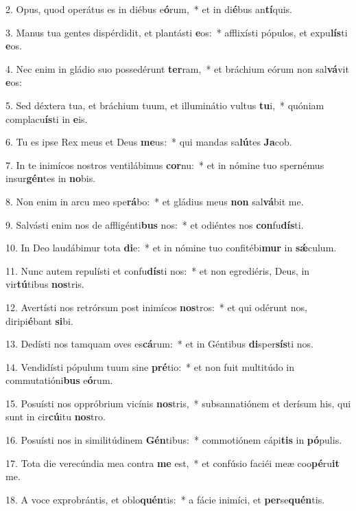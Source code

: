 2. Opus, quod operátus es in diébus e\textbf{ó}rum,~*  et in di\textbf{é}bus an\textbf{tí}quis.\

3. Manus tua gentes dispérdidit, et plantásti \textbf{e}os:~*  afflixísti pópulos, et expu\textbf{lís}ti \textbf{e}os.\

4. Nec enim in gládio suo possedérunt \textbf{ter}ram,~*  et bráchium eórum non sal\textbf{vá}vit \textbf{e}os:\

5. Sed déxtera tua, et bráchium tuum, et illuminátio vultus \textbf{tu}i,~*  quóniam complacu\textbf{ís}ti in \textbf{e}is.\

6. Tu es ipse Rex meus et Deus \textbf{me}us:~*  qui mandas sa\textbf{lú}tes \textbf{Ja}cob.\

7. In te inimícos nostros ventilábimus \textbf{cor}nu:~*  et in nómine tuo spernémus insur\textbf{gén}tes in \textbf{no}bis.\

8. Non enim in arcu meo spe\textbf{rá}bo:~*  et gládius meus \textbf{non} sal\textbf{vá}bit me.\

9. Salvásti enim nos de affligénti\textbf{bus} nos:~*  et odiéntes nos \textbf{con}fu\textbf{dís}ti.\

10. In Deo laudábimur tota \textbf{di}e:~*  et in nómine tuo confitébi\textbf{mur} in \textbf{sǽ}culum.\

11. Nunc autem repulísti et confu\textbf{dís}ti nos:~*  et non egrediéris, Deus, in vir\textbf{tú}tibus \textbf{nos}tris.\

12. Avertísti nos retrórsum post inimícos \textbf{nos}tros:~*  et qui odérunt nos, diripi\textbf{é}bant \textbf{si}bi.\

13. Dedísti nos tamquam oves es\textbf{cá}rum:~*  et in Géntibus \textbf{di}sper\textbf{sís}ti nos.\

14. Vendidísti pópulum tuum sine \textbf{pré}tio:~*  et non fuit multitúdo in commutatióni\textbf{bus} e\textbf{ó}rum.\

15. Posuísti nos oppróbrium vicínis \textbf{nos}tris,~*  subsannatiónem et derísum his, qui sunt in cir\textbf{cú}itu \textbf{nos}tro.\

16. Posuísti nos in similitúdinem \textbf{Gén}tibus:~*  commotiónem cápi\textbf{tis} in \textbf{pó}pulis.\

17. Tota die verecúndia mea contra \textbf{me} est,~*  et confúsio faciéi meæ coo\textbf{pé}ru\textbf{it} me.\

18. A voce exprobrántis, et oblo\textbf{quén}tis:~*  a fácie inimíci, et \textbf{per}se\textbf{quén}tis.\


